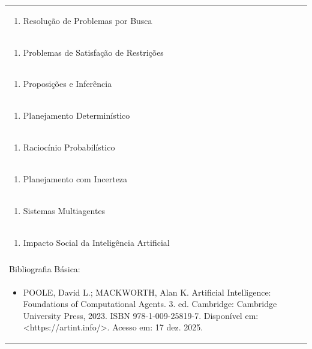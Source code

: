 \documentclass[11pt]{article}
\begin{document}
\begin{center}
\begin{longtable}{|p{4cm}|p{4cm}|p{4cm}|p{4cm}|}
\multicolumn{4}{|p{\dimexpr 16cm + 6\tabcolsep\relax}|}{\begin{enumerate}[start=2]\item Resolução de Problemas por Busca\end{enumerate}}\\
\multicolumn{4}{|p{\dimexpr 16cm + 6\tabcolsep\relax}|}{\begin{enumerate}[start=3]\item Problemas de Satisfação de Restrições\end{enumerate}}\\
\multicolumn{4}{|p{\dimexpr 16cm + 6\tabcolsep\relax}|}{\begin{enumerate}[start=4]\item Proposições e Inferência\end{enumerate}}\\
\multicolumn{4}{|p{\dimexpr 16cm + 6\tabcolsep\relax}|}{\begin{enumerate}[start=5]\item Planejamento Determinístico\end{enumerate}}\\
\multicolumn{4}{|p{\dimexpr 16cm + 6\tabcolsep\relax}|}{\begin{enumerate}[start=6]\item Raciocínio Probabilístico\end{enumerate}}\\
\multicolumn{4}{|p{\dimexpr 16cm + 6\tabcolsep\relax}|}{\begin{enumerate}[start=7]\item Planejamento com Incerteza\end{enumerate}}\\
\multicolumn{4}{|p{\dimexpr 16cm + 6\tabcolsep\relax}|}{\begin{enumerate}[start=8]\item Sistemas Multiagentes\end{enumerate}}\\
\multicolumn{4}{|p{\dimexpr 16cm + 6\tabcolsep\relax}|}{\begin{enumerate}[start=9]\item Impacto Social da Inteligência Artificial\end{enumerate}}\\
\multicolumn{4}{|p{\dimexpr 16cm + 6\tabcolsep\relax}|}{}\\
\hline
\multicolumn{4}{|p{16cm}|}{Bibliografia Básica:}\\*
\multicolumn{4}{|p{\dimexpr 16cm + 6\tabcolsep\relax}|}{\begin{itemize}\item POOLE, David L.; MACKWORTH, Alan K. Artificial Intelligence: Foundations of Computational Agents. 3. ed. Cambridge: Cambridge University Press, 2023. ISBN 978-1-009-25819-7. Disponível em: <https://artint.info/>. Acesso em: 17 dez. 2025.\end{itemize}}\\

\end{longtable}
\end{center}
\end{document}
